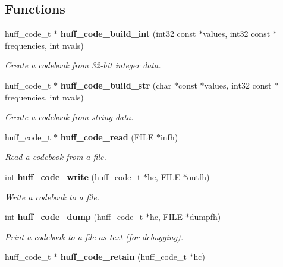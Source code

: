 \subsection*{Functions}
\begin{CompactItemize}
\item 
huff\_\-code\_\-t $\ast$ {\bf huff\_\-code\_\-build\_\-int} (int32 const $\ast$values, int32 const $\ast$frequencies, int nvals)\label{huff__code_8h_eac9c787bd2b0c44645fc36668c8cb72}

\begin{CompactList}\small\item\em Create a codebook from 32-bit integer data. \item\end{CompactList}\item 
huff\_\-code\_\-t $\ast$ {\bf huff\_\-code\_\-build\_\-str} (char $\ast$const $\ast$values, int32 const $\ast$frequencies, int nvals)\label{huff__code_8h_e36c06fbf1ea3d3d8b8898489b8d0555}

\begin{CompactList}\small\item\em Create a codebook from string data. \item\end{CompactList}\item 
huff\_\-code\_\-t $\ast$ {\bf huff\_\-code\_\-read} (FILE $\ast$infh)\label{huff__code_8h_56e0b59ab72965a106d981edfcb80a58}

\begin{CompactList}\small\item\em Read a codebook from a file. \item\end{CompactList}\item 
int {\bf huff\_\-code\_\-write} (huff\_\-code\_\-t $\ast$hc, FILE $\ast$outfh)\label{huff__code_8h_00510cb2e10d3257cebb637c1f92967e}

\begin{CompactList}\small\item\em Write a codebook to a file. \item\end{CompactList}\item 
int {\bf huff\_\-code\_\-dump} (huff\_\-code\_\-t $\ast$hc, FILE $\ast$dumpfh)\label{huff__code_8h_13073aec67ffe7c7d01dfeba7aefacf8}

\begin{CompactList}\small\item\em Print a codebook to a file as text (for debugging). \item\end{CompactList}\item 
huff\_\-code\_\-t $\ast$ {\bf huff\_\-code\_\-retain} (huff\_\-code\_\-t $\ast$hc)\label{huff__code_8h_65f498a58da214934dd19d6892bd838d}


\end{CompactItemize}
